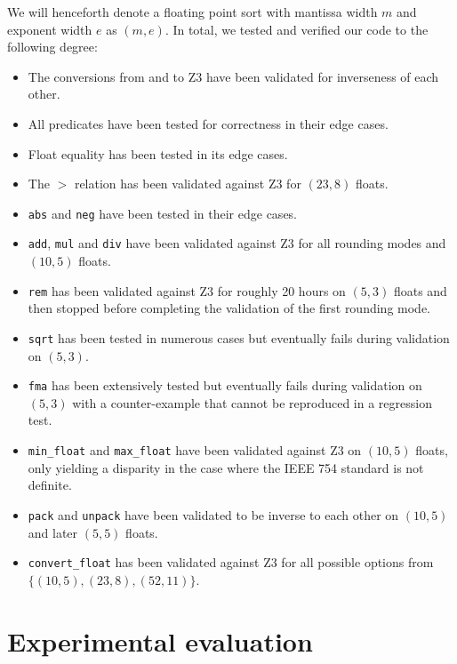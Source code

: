 \documentclass[a4paper,UKenglish,cleveref, autoref, thm-restate]{lipics-v2019}
\begin{document}
We will henceforth denote a floating point sort with mantissa width $m$ and exponent width $e$ as $(m, e)$. In total, we tested and verified our code to the following degree:
\begin{itemize}
	\item The conversions from and to Z3 have been validated for inverseness of each other.
	\item All predicates have been tested for correctness in their edge cases.
	\item Float equality has been tested in its edge cases.
	\item The $>$ relation has been validated against Z3 for $(23, 8)$ floats.
	\item \verb|abs| and \verb|neg| have been tested in their edge cases.
	\item \verb|add|, \verb|mul| and \verb|div| have been validated against Z3 for all rounding modes and $(10, 5)$ floats.
	\item \verb|rem| has been validated against Z3 for roughly 20 hours on $(5, 3)$ floats and then stopped before completing the validation of the first rounding mode.
	\item \verb|sqrt| has been tested in numerous cases but eventually fails during validation on $(5, 3)$.
	\item \verb|fma| has been extensively tested but eventually fails during validation on $(5, 3)$ with a counter-example that cannot be reproduced in a regression test.
	\item \verb|min_float| and \verb|max_float| have been validated against Z3 on $(10, 5)$ floats, only yielding a disparity in the case where the IEEE 754 standard is not definite.
	\item \verb|pack| and \verb|unpack| have been validated to be inverse to each other on $(10, 5)$ and later $(5, 5)$ floats.
	\item \verb|convert_float| has been validated against Z3 for all possible options from \\ $\{(10, 5), (23, 8), (52, 11)\}$.
\end{itemize}

\section{Experimental evaluation}
\end{document}
